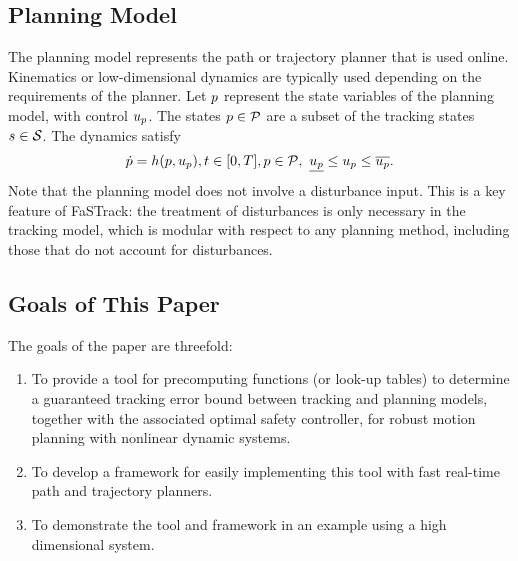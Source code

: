 \subsection{Planning Model}
The planning model represents the path or trajectory planner that is used online. Kinematics or low-dimensional dynamics are typically used depending on the requirements of the planner. Let $p$ represent the state variables of the planning model, with control $u_p$. The states $p \in \mathcal{P}$ are a subset of the tracking states $s \in \mathcal{S}$. The dynamics satisfy 
\begin{equation}
\begin{aligned}
\label{eq:pdyn}
\dot{p} = h(p, u_p), t \in [0, T], p \in \mathcal{P}, \ \underline{u_p} \leq u_p \leq \overline{u_p}.
\end{aligned}
\end{equation}
Note that the planning model does not involve a disturbance input. This is a key feature of FaSTrack: the treatment of disturbances is only necessary in the tracking model, which is modular with respect to any planning method, including those that do not account for disturbances.

\subsection{Goals of This Paper}
The goals of the paper are threefold:
\begin{enumerate}
	\item To provide a tool for precomputing functions (or look-up tables) to determine a guaranteed tracking error bound between tracking and planning models, together with the associated optimal safety controller, for robust motion planning with nonlinear dynamic systems.
	\item To develop a framework for easily implementing this tool with fast real-time path and trajectory planners.
	\item To demonstrate the tool and framework in an example using a high dimensional system.
\end{enumerate}

